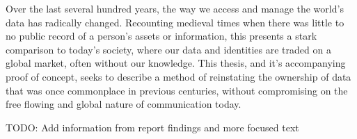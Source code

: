\abstract

\thispagestyle{plain}
\setcounter{page}{1}

Over the last several hundred years, the way we access and manage the world's data has radically changed. Recounting medieval times when there was little to no public record of a person's assets or information, this presents a stark comparison to today's society, where our data and identities are traded on a global market, often without our knowledge. This thesis, and it's accompanying proof of concept, seeks to describe a method of reinstating the ownership of data that was once commonplace in previous centuries, without compromising on the free flowing and global nature of communication today.

TODO: Add information from report findings and more focused text



